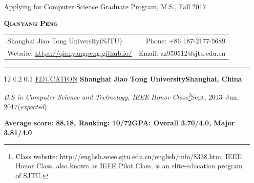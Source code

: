 \documentclass{article}
\begin{document}
\pagestyle{empty}
\newcommand{\cvtitle}[5]{ {\huge\bfseries\scshape #1} \vspace{1em}\\
\begin{tabular*}{\linewidth}{l@{\extracolsep{\fill}}r}
#2 & #4 \\ #3 & #5 \\
\end{tabular*}
\vspace{3pt} \rule{\textwidth}{1.25pt}}

\makeatletter
\renewcommand{\section}{\@startsection {section} {12} {\z@} {0.2\baselineskip} {0.1\baselineskip} {\normalfont\large\scshape\bfseries}}
\makeatother

\newenvironment{entrylist}{%
\begin{tabular*}{\textwidth}{@{\extracolsep{\fill}}ll} 
}{
\end{tabular*} 
}
\newcommand{\entry}[4]{%
#1&\parbox[t]{.8\textwidth}{%
\textbf{#2}%
#3\\%
#4\vspace{\parsep}%
}\\}

\hfill Applying for Computer Science Graduate Program, M.S., Fall 2017

\cvtitle{Qianyang Peng} %
{Shanghai Jiao Tong University(SJTU)} %
{Website: \href{https://qianyangpeng.github.io/}{https://qianyangpeng.github.io/}} %
{Phone: +86 187-2177-5689} %
{Email: az950512@sjtu.edu.cn} %

\section{\underline{EDUCATION}}
\textbf{Shanghai Jiao Tong University}\hfill\textbf{Shanghai, China}

\emph{B.S in Computer Science and Technology, IEEE Honor Class\footnote{Class website: http://english.seiee.sjtu.edu.cn/english/info/8338.htm. IEEE Honor Class, also known as IEEE Pilot Class, is an elite-education program of SJTU.}}\hfill Sept. 2013--Jun. 2017(\emph{expected})

\textbf{Average score: 88.18, Ranking: 10/72}\quad\textbf{GPA: Overall 3.70/4.0, Major 3.81/4.0}
\vspace{\parsep}
\end{document}
